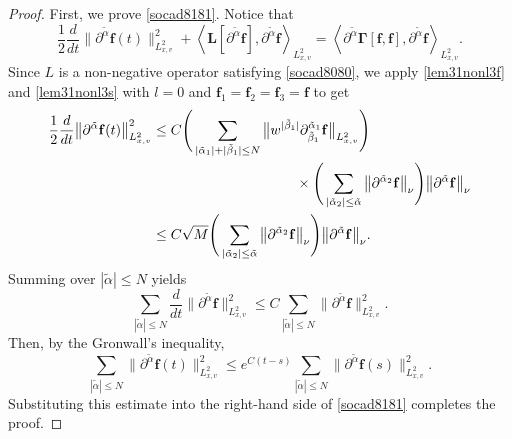 \documentclass[reqno]{amsart}
\numberwithin{equation}{section}
\numberwithin{equation}{section}
\begin{document}
		\begin{proof}
			First, we prove \eqref{socad8181}. Notice that
			\begin{equation}
			\frac{1}{2}\frac{d}{dt}\big\|\partial^{\tilde{\alpha}} \mathbf{f}(t)\big\|^2_{L^{2}_{x,v}} +   \left\langle \mathbf{L}[\partial^{\tilde{\alpha}} \mathbf{f}], \partial^{\tilde{\alpha}} \mathbf{f} \right\rangle_{L^{2}_{x,v}} = \left\langle \partial^{\tilde{\alpha}} \bm{\Gamma}[\mathbf{f}, \mathbf{f}], \partial^{\tilde{\alpha}} \mathbf{f} \right\rangle_{L^{2}_{x,v}}. 
			\end{equation}
			Since $L$ is a non-negative operator satisfying \eqref{socad8080}, we apply \eqref{lem31nonl3f} and \eqref{lem31nonl3s} with $l = 0$ and $\mathbf{f}_1 = \mathbf{f}_2 = \mathbf{f}_3 = \mathbf{f}$ to get
			\begin{align}
				\frac{1}{2}\frac{d}{dt}\big\|\partial^{\tilde{\alpha}} \mathbf{f}(t)\big\|_{L^{2}_{x,v}}^2 &\leq C\Bigg( \sum_{|\tilde{\alpha}_1|+|\tilde{\beta}_1|\leq N}\big\Vert w^{|\tilde{\beta}_1|}\partial_{\tilde{\beta}_1}^{\tilde{\alpha}_1}\mathbf{f}\big\Vert_{L^{2}_{x,v}} \Bigg)\\
				&\hspace{3.6cm}\times\Bigg( \sum_{|\tilde{\alpha}_2| \le \tilde{\alpha}} \big\|\partial^{\tilde{\alpha}_2} \mathbf{f} \big\|_{\nu} \Bigg)
				\big\|\partial^{\tilde{\alpha}} \mathbf{f}\big\|_{\nu} \notag\\
				&\le C\sqrt{M}\Bigg(\sum_{|\tilde{\alpha}_2| \le \tilde{\alpha}} \big\|\partial^{\tilde{\alpha}_2} \mathbf{f}\big\|_{\nu} \Bigg)\big\|\partial^{\tilde{\alpha}} \mathbf{f}\big\|_{\nu}. 
			\end{align}
			Summing over $|{\tilde{\alpha}}| \leq N$ yields
			\begin{equation*}
			\sum_{|\tilde{\alpha}| \le N}\frac{d}{dt}\big\|\partial^{\tilde{\alpha}} \mathbf{f} \big\|_{L^{2}_{x,v}}^2 \le C\sum_{|\tilde{\alpha}| \le N}\big\|\partial^{\tilde{\alpha}} \mathbf{f} \big\|_{L^{2}_{x,v}}^2.
			\end{equation*}
			Then, by the Gronwall's inequality,
			\begin{equation*}
				\sum_{|\tilde{\alpha}| \le N}\big\|\partial^{\tilde{\alpha}} \mathbf{f}(t)\big\|_{L^{2}_{x,v}}^2 \le e^{C(t-s)}\sum_{|\tilde{\alpha}| \le N}\big\|\partial^{\tilde{\alpha}} \mathbf{f}(s)\big\|_{L^{2}_{x,v}}^2.
			\end{equation*}
			Substituting this estimate into the right-hand side of \eqref{socad8181} completes the proof.
			

\end{proof}
\end{document}

